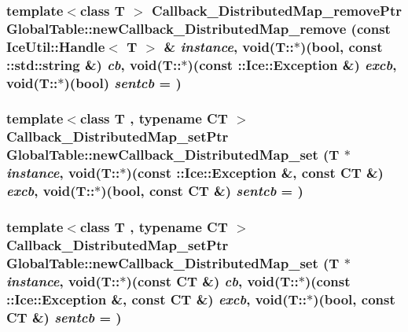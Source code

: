 \label{namespace_global_table_a9cada3fa6913d09443209b780d105769}
\hypertarget{namespace_global_table_a7b5e731046480df6d5b261d98247949a}{
\subsubsection[{newCallback\_\-DistributedMap\_\-remove}]{\setlength{\rightskip}{0pt plus 5cm}template$<$class T $>$ {\bf Callback\_\-DistributedMap\_\-removePtr} GlobalTable::newCallback\_\-DistributedMap\_\-remove (const IceUtil::Handle$<$ T $>$ \& {\em instance}, \/  void(T::$\ast$)(bool, const ::std::string \&) {\em cb}, \/  void(T::$\ast$)(const ::Ice::Exception \&) {\em excb}, \/  void(T::$\ast$)(bool) {\em sentcb} = {})}}
\label{namespace_global_table_a7b5e731046480df6d5b261d98247949a}
\hypertarget{namespace_global_table_a8c632af2f4eaf774020b7c1502a7b529}{
\subsubsection[{newCallback\_\-DistributedMap\_\-set}]{\setlength{\rightskip}{0pt plus 5cm}template$<$class T , typename CT $>$ {\bf Callback\_\-DistributedMap\_\-setPtr} GlobalTable::newCallback\_\-DistributedMap\_\-set (T $\ast$ {\em instance}, \/  void(T::$\ast$)(const ::Ice::Exception \&, const CT \&) {\em excb}, \/  void(T::$\ast$)(bool, const CT \&) {\em sentcb} = {})}}
\label{namespace_global_table_a8c632af2f4eaf774020b7c1502a7b529}
\hypertarget{namespace_global_table_aba7735d6f323646d833fd862cb479c39}{
\subsubsection[{newCallback\_\-DistributedMap\_\-set}]{\setlength{\rightskip}{0pt plus 5cm}template$<$class T , typename CT $>$ {\bf Callback\_\-DistributedMap\_\-setPtr} GlobalTable::newCallback\_\-DistributedMap\_\-set (T $\ast$ {\em instance}, \/  void(T::$\ast$)(const CT \&) {\em cb}, \/  void(T::$\ast$)(const ::Ice::Exception \&, const CT \&) {\em excb}, \/  void(T::$\ast$)(bool, const CT \&) {\em sentcb} = {})}}
